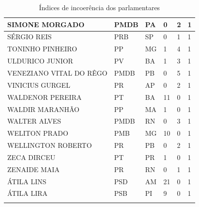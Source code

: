 \begin{apendicesenv}
\begin{longtable}{|L{4cm}|C{2cm}|C{1cm}|C{2cm}|C{1cm}|C{2cm}|}
SIMONE MORGADO & PMDB & PA & 0 & 2 & 1 \\ \hline
SÉRGIO REIS & PRB & SP & 0 & 1 & 1 \\ \hline
TONINHO PINHEIRO & PP & MG & 1 & 4 & 1 \\ \hline
ULDURICO JUNIOR & PV & BA & 1 & 3 & 1 \\ \hline
VENEZIANO VITAL DO RÊGO & PMDB & PB & 0 & 5 & 1 \\ \hline
VINICIUS GURGEL & PR & AP & 0 & 2 & 1 \\ \hline
WALDENOR PEREIRA & PT & BA & 11 & 0 & 1 \\ \hline
WALDIR MARANHÃO & PP & MA & 1 & 0 & 1 \\ \hline
WALTER ALVES & PMDB & RN & 0 & 3 & 1 \\ \hline
WELITON PRADO & PMB & MG & 10 & 0 & 1 \\ \hline
WELLINGTON ROBERTO & PR & PB & 0 & 2 & 1 \\ \hline
ZECA DIRCEU & PT & PR & 1 & 0 & 1 \\ \hline
ZENAIDE MAIA & PR & RN & 0 & 1 & 1 \\ \hline
ÁTILA LINS & PSD & AM & 21 & 0 & 1 \\ \hline
ÁTILA LIRA & PSB & PI & 9 & 0 & 1 \\ \hline
\caption{Índices de incoerência dos parlamentares}
\label{Teste}
\end{longtable}


\end{apendicesenv}
